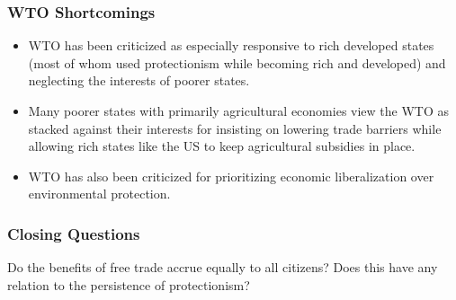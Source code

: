 \documentclass{beamer}
\begin{document}
\begin{frame} 
	\frametitle{\LARGE{WTO Shortcomings}}
	\begin{itemize}
		\item WTO has been criticized as especially responsive to rich developed states (most of whom used protectionism while becoming rich and developed) and neglecting the interests of poorer states. \pause
		\item Many poorer states with primarily agricultural economies view the WTO as stacked against their interests for insisting on lowering trade barriers while allowing rich states like the US to keep agricultural subsidies in place. \pause
		\item WTO has also been criticized for prioritizing economic liberalization over environmental protection.
	\end{itemize}
\end{frame}

\begin{frame} 
	\frametitle{\LARGE{Closing Questions}}
	\centering
	\Large{Do the benefits of free trade accrue equally to all citizens? Does this have any relation to the persistence of protectionism?} 
\end{frame}
\end{document}
